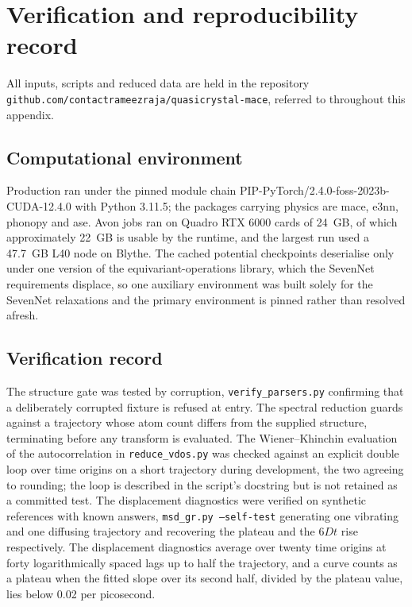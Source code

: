 \section{Verification and reproducibility record}
\label{app:verification}

All inputs, scripts and reduced data are held in the repository
\texttt{github.com/contactrameezraja/}\allowbreak\texttt{quasicrystal-mace}, referred to throughout this appendix.

\subsection{Computational environment}
Production ran under the pinned module chain
PIP-PyTorch/2.4.0-foss-2023b-CUDA-12.4.0 with Python 3.11.5; the packages
carrying physics are mace, e3nn, phonopy and ase. Avon jobs ran on Quadro
RTX 6000 cards of 24~GB, of which approximately 22~GB is usable by the
runtime, and the largest run used a 47.7~GB L40 node on Blythe. The cached
potential checkpoints deserialise only under one version of the
equivariant-operations library, which the SevenNet requirements displace,
so one auxiliary environment was built solely for the SevenNet relaxations
and the primary environment is pinned rather than resolved afresh.

\subsection{Verification record}
The structure gate was tested by corruption, \texttt{verify\_parsers.py}
confirming that a deliberately corrupted fixture is refused at entry. The
spectral reduction guards against a trajectory whose atom count differs
from the supplied structure, terminating before any transform is
evaluated. The Wiener--Khinchin evaluation of the autocorrelation in
\texttt{reduce\_vdos.py} was checked against an explicit double loop over
time origins on a short trajectory during development, the two agreeing
to rounding; the loop is described in the script's docstring but is not
retained as a committed test. The displacement diagnostics were verified
on synthetic references with known answers, \texttt{msd\_gr.py --self-test}
generating one vibrating and one diffusing trajectory and recovering the
plateau and the $6Dt$ rise respectively. The displacement diagnostics average over twenty time origins at forty logarithmically spaced lags up to half the trajectory, and a curve counts as a plateau when the fitted slope over its second half, divided by the plateau value, lies below 0.02 per picosecond.


